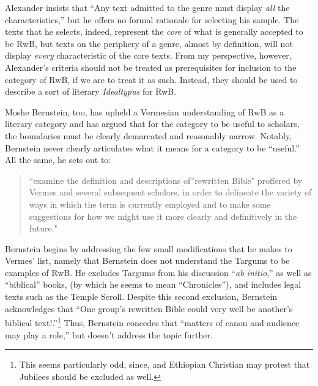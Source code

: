 Alexander insists that ``Any text admitted to the genre must display
\emph{all} the characteristics,''\autocite[119 n.
11]{alexander_carson-williamson1988} but he offers no formal rationale
for selecting his sample. The texts that he selects, indeed, represent
the \emph{core} of what is generally accepted to be RwB, but texts on
the periphery of a genre, almost by definition, will not display
\emph{every} characteristic of the core texts. From my perspective,
however, Alexander's criteria should not be treated as prerequisites for
inclusion to the category of RwB, if we are to treat it as such.
Instead, they should be used to describe a sort of literary
\emph{Idealtypus} for RwB.

Moshe Bernstein, too, has upheld a Vermesian understanding of RwB as a
literary category and has argued that for the category to be useful to
scholars, the boundaries must be clearly demarcated and reasonably
narrow.\autocite{bernstein_textus2005} Notably, Bernstein never clearly
articulates what it means for a category to be ``useful.'' All the same,
he sets out to:

\begin{quote}
``examine the definition and descriptions of''rewritten Bible" proffered
by Vermes and several subsequent scholars, in order to delineate the
variety of ways in which the term is currently employed and to make some
suggestions for how we might use it more clearly and definitively in the
future." \autocite[171--172]{bernstein_textus2005}
\end{quote}

Bernstein begins by addressing the few small modifications that he makes
to Vermes' list, namely that Bernstein does not understand the Targums
to be examples of RwB. He excludes Targums from his discussion
``\emph{ab initio},'' as well as ``biblical'' books, (by which he seems
to mean ``Chronicles''), and includes legal texts such as the Temple
Scroll. Despite this second exclusion, Bernstein acknowledges that ``One
group's rewritten Bible could very well be another's biblical
text!.''\footnote{\textcite[175]{bernstein_textus2005} This seems
  particularly odd, since, and Ethiopian Christian may protest that
  Jubilees should be excluded as well.} Thus, Bernstein concedes that
``matters of canon and audience may play a role,'' but doesn't address
the topic further.

